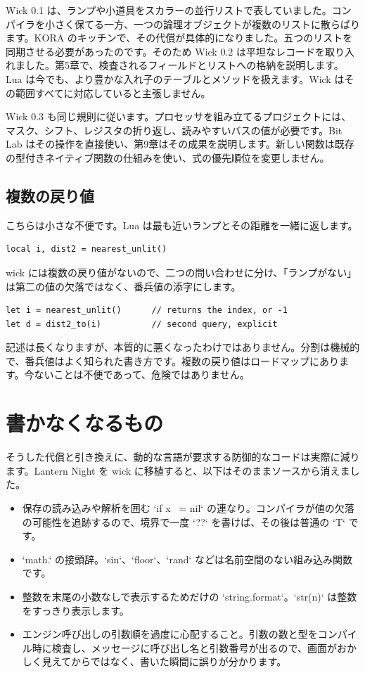 Wick 0.1 は、ランプや小道具をスカラーの並行リストで表していました。コンパイラを小さく保てる一方、一つの論理オブジェクトが複数のリストに散らばります。KORA のキッチンで、その代償が具体的になりました。五つのリストを同期させる必要があったのです。そのため Wick 0.2 は平坦なレコードを取り入れました。第5章で、検査されるフィールドとリストへの格納を説明します。Lua は今でも、より豊かな入れ子のテーブルとメソッドを扱えます。Wick はその範囲すべてに対応していると主張しません。

Wick 0.3 も同じ規則に従います。プロセッサを組み立てるプロジェクトには、マスク、シフト、レジスタの折り返し、読みやすいバスの値が必要です。Bit Lab はその操作を直接使い、第9章はその成果を説明します。新しい関数は既存の型付きネイティブ関数の仕組みを使い、式の優先順位を変更しません。

\subsection{複数の戻り値}

こちらは小さな不便です。Lua は最も近いランプとその距離を一緒に返します。

\begin{lstlisting}[language=luatwin]
local i, dist2 = nearest_unlit()
\end{lstlisting}

\noindent
wick には複数の戻り値がないので、二つの問い合わせに分け、「ランプがない」は第二の値の欠落ではなく、番兵値の添字にします。

\begin{lstlisting}[language=wick]
let i = nearest_unlit()      // returns the index, or -1
let d = dist2_to(i)          // second query, explicit
\end{lstlisting}

\noindent
記述は長くなりますが、本質的に悪くなったわけではありません。分割は機械的で、番兵値はよく知られた書き方です。複数の戻り値はロードマップにあります。今ないことは不便であって、危険ではありません。

\section{書かなくなるもの}

そうした代償と引き換えに、動的な言語が要求する防御的なコードは実際に減ります。Lantern Night を wick に移植すると、以下はそのままソースから消えました。

\begin{itemize}
\item 保存の読み込みや解析を囲む `if x ~= nil` の連なり。コンパイラが値の欠落の可能性を追跡するので、境界で一度 `??` を書けば、その後は普通の `T` です。
\item `math.` の接頭辞。`sin`、`floor`、`rand` などは名前空間のない組み込み関数です。
\item 整数を末尾の小数なしで表示するためだけの `string.format`。`str(n)` は整数をすっきり表示します。
\item エンジン呼び出しの引数順を過度に心配すること。引数の数と型をコンパイル時に検査し、メッセージに呼び出し名と引数番号が出るので、画面がおかしく見えてからではなく、書いた瞬間に誤りが分かります。
\end{itemize}

